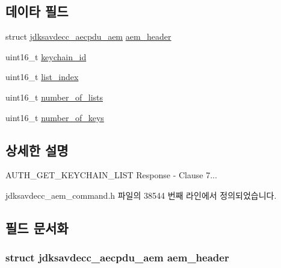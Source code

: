 \subsection*{데이타 필드}
\begin{DoxyCompactItemize}
\item 
struct \hyperlink{structjdksavdecc__aecpdu__aem}{jdksavdecc\+\_\+aecpdu\+\_\+aem} \hyperlink{structjdksavdecc__aem__command__auth__get__keychain__list__response_ae1e77ccb75ff5021ad923221eab38294}{aem\+\_\+header}
\item 
uint16\+\_\+t \hyperlink{structjdksavdecc__aem__command__auth__get__keychain__list__response_a10ed6547e01665c453e2a40b142f7526}{keychain\+\_\+id}
\item 
uint16\+\_\+t \hyperlink{structjdksavdecc__aem__command__auth__get__keychain__list__response_a2860632dbc7912d3e434203be8f2d9da}{list\+\_\+index}
\item 
uint16\+\_\+t \hyperlink{structjdksavdecc__aem__command__auth__get__keychain__list__response_a45b14c0c59fa21d49e896c11e3344c54}{number\+\_\+of\+\_\+lists}
\item 
uint16\+\_\+t \hyperlink{structjdksavdecc__aem__command__auth__get__keychain__list__response_a4b5b63e09e22100325d6689bfbe02865}{number\+\_\+of\+\_\+keys}
\end{DoxyCompactItemize}


\subsection{상세한 설명}
A\+U\+T\+H\+\_\+\+G\+E\+T\+\_\+\+K\+E\+Y\+C\+H\+A\+I\+N\+\_\+\+L\+I\+ST Response -\/ Clause 7... 

jdksavdecc\+\_\+aem\+\_\+command.\+h 파일의 38544 번째 라인에서 정의되었습니다.



\subsection{필드 문서화}
\subsubsection[{\texorpdfstring{aem\+\_\+header}{aem_header}}]{\setlength{\rightskip}{0pt plus 5cm}struct {\bf jdksavdecc\+\_\+aecpdu\+\_\+aem} aem\+\_\+header}\hypertarget{structjdksavdecc__aem__command__auth__get__keychain__list__response_ae1e77ccb75ff5021ad923221eab38294}{}\label{structjdksavdecc__aem__command__auth__get__keychain__list__response_ae1e77ccb75ff5021ad923221eab38294}


